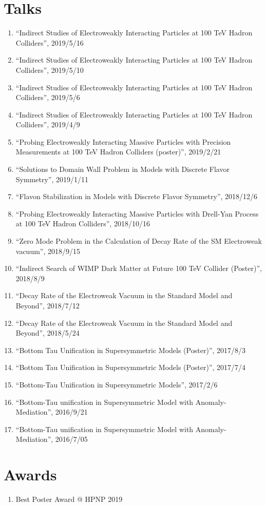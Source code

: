 \documentclass[12pt]{article}
\begin{document}
\vspace{-5mm}


\nocite{*}

\section*{Talks}

\begin{enumerate}
 \item ``Indirect Studies of Electroweakly Interacting Particles at 100 TeV Hadron Colliders'', 2019/5/16
 \item ``Indirect Studies of Electroweakly Interacting Particles at 100 TeV Hadron Colliders'', 2019/5/10
 \item ``Indirect Studies of Electroweakly Interacting Particles at 100 TeV Hadron Colliders'', 2019/5/6
 \item ``Indirect Studies of Electroweakly Interacting Particles at 100 TeV Hadron Colliders'', 2019/4/9
 \item ``Probing Electroweakly Interacting Massive Particles with Precision Measurements at 100 TeV Hadron Colliders (poster)'', 2019/2/21
 \item ``Solutions to Domain Wall Problem in Models with Discrete Flavor Symmetry'', 2019/1/11
 \item ``Flavon Stabilization in Models with Discrete Flavor Symmetry'', 2018/12/6
 \item ``Probing Electroweakly Interacting Massive Particles with Drell-Yan Process at 100 TeV Hadron Colliders'', 2018/10/16
 \item ``Zero Mode Problem in the Calculation of Decay Rate of the SM Electroweak vacuum'', 2018/9/15
 \item ``Indirect Search of WIMP Dark Matter at Future 100 TeV Collider (Poster)'', 2018/8/9
 \item ``Decay Rate of the Electroweak Vacuum in the Standard Model and Beyond'', 2018/7/12
 \item ``Decay Rate of the Electroweak Vacuum in the Standard Model and Beyond'', 2018/5/24
 \item ``Bottom Tau Unification in Supersymmetric Models (Poster)'', 2017/8/3
 \item ``Bottom Tau Unification in Supersymmetric Models (Poster)'', 2017/7/4
 \item ``Bottom-Tau Unification in Supersymmetric Models'', 2017/2/6
 \item ``Bottom-Tau unification in Supersymmetric Model with Anomaly-Mediation'', 2016/9/21
 \item ``Bottom-Tau unification in Supersymmetric Model with Anomaly-Mediation'', 2016/7/05
\end{enumerate}

\section*{Awards}

\begin{enumerate}
 \item Best Poster Award @ HPNP 2019
\end{enumerate}
\end{document}
